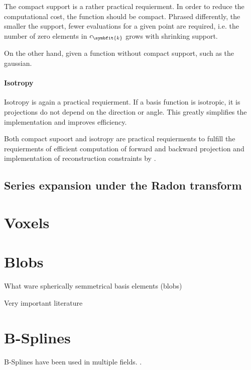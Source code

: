 The compact support is a rather practical requierment. In order to reduce the computational cost,
the function should be compact. Phrased differently, the smaller the support, fewer evaluations
    for a given point are required, i.e. the number of zero elements in $c_{\symbfit{k}}$ grows with shrinking
support.

On the other hand, given a function without compact support, such as the gaussian.

\paragraph{Isotropy}

Isotropy is again a practical requierment. If a basis function is isotropic, it is projections
do not depend on the direction or angle. This greatly simplifies the implementation and improves efficiency.

Both compact supoort and isotropy are practical requierments to fulfill the requierments of
efficient computation of forward and backward projection and implementation of reconstruction constraints
by \cite{hanson_local_1985}.

\subsection{Series expansion under the Radon transform}


\section{Voxels}

\section{Blobs}

What ware spherically semmetrical basis elements (blobs)

Very important literature
\cite{lewitt_alternatives_1992}
\cite{matej_practical_1996}
 
\section{B-Splines}

B-Splines have been used in multiple fields. .

